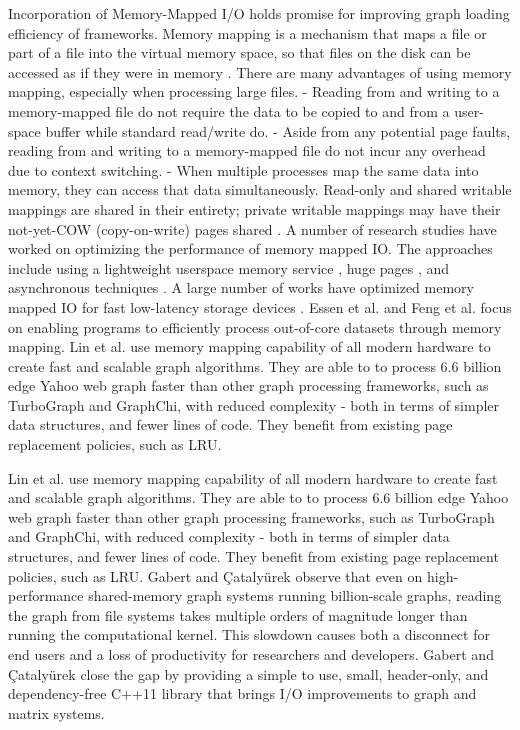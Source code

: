 Incorporation of Memory-Mapped I/O holds promise for improving graph loading efficiency of frameworks. Memory mapping is a mechanism that maps a file or part of a file into the virtual memory space, so that files on the disk can be accessed as if they were in memory \cite{lin2014mmap}. There are many advantages of using memory mapping, especially when processing large files. - Reading from and writing to a memory-mapped file do not require the data to be copied to and from a user-space buffer while standard read/write do. - Aside from any potential page faults, reading from and writing to a memory-mapped file do not incur any overhead due to context switching. - When multiple processes map the same data into memory, they can access that data simultaneously. Read-only and shared writable mappings are shared in their entirety; private writable mappings may have their not-yet-COW (copy-on-write) pages shared \cite{lin2014mmap}. A number of research studies have worked on optimizing the performance of memory mapped IO. The approaches include using a lightweight userspace memory service \cite{li2019userland}, huge pages \cite{malliotakis2021hugemap}, and asynchronous techniques \cite{imamura2019poster}. A large number of works have optimized memory mapped IO for fast low-latency storage devices \cite{song2012low, song2016efficient, papagiannis2020optimizing, papagiannis2021memory, alverti2022daxvm, leis2023virtual}. Essen et al. \cite{van2015di} and Feng et al. \cite{feng2023tricache} focus on enabling programs to efficiently process out-of-core datasets through memory mapping. Lin et al. \cite{lin2014mmap} use memory mapping capability of all modern hardware to create fast and scalable graph algorithms. They are able to to process $6.6$ billion edge Yahoo web graph faster than other graph processing frameworks, such as TurboGraph and GraphChi, with reduced complexity - both in terms of simpler data structures, and fewer lines of code. They benefit from existing page replacement policies, such as LRU.

Lin et al. \cite{lin2014mmap} use memory mapping capability of all modern hardware to create fast and scalable graph algorithms. They are able to to process 6.6 billion edge Yahoo web graph faster than other graph processing frameworks, such as TurboGraph and GraphChi, with reduced complexity - both in terms of simpler data structures, and fewer lines of code. They benefit from existing page replacement policies, such as LRU. Gabert and Çatalyürek \cite{gabert2021pigo} observe that even on high-performance shared-memory graph systems running billion-scale graphs, reading the graph from file systems takes multiple orders of magnitude longer than running the computational kernel. This slowdown causes both a disconnect for end users and a loss of productivity for researchers and developers. Gabert and Çatalyürek \cite{gabert2021pigo} close the gap by providing a simple to use, small, header-only, and dependency-free C++11 library that brings I/O improvements to graph and matrix systems.

